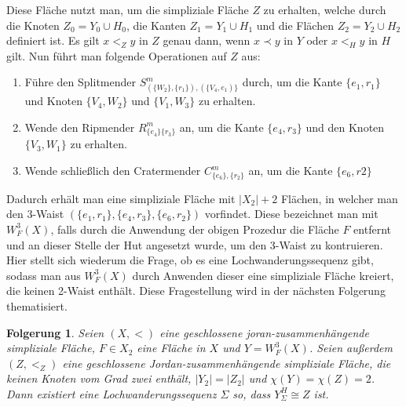 \documentclass[12pt,titlepage,twoside,cleardoublepage]{article}
\theoremstyle{nummermitklammern}
\newtheorem{folgerung}[temp]{Folgerung}
\newtheorem{folgerung}[zahl]{Folgerung}
\numberwithin{equation}{section}
\begin{document}
Diese Fläche nutzt man, um die simpliziale Fläche $Z$ zu erhalten, welche durch die Knoten $Z_0=Y_0 \cup H_0$, die Kanten $Z_1=Y_1 \cup H_1$ und die Flächen $Z_2=Y_2 \cup H_2$ definiert ist. Es gilt $x<_Z y$ in $Z$ genau dann, wenn $x \prec y$ in $Y$ oder $x <_H y$ in $H$ gilt. Nun führt man folgende Operationen auf $Z$ aus:
\begin{enumerate}
\item Führe den Splitmender $S^m_{(\{W_2\},\{r_1\}),(\{V_4,e_1)\}}$ durch, um die Kante $\{e_1,r_1\}$ und Knoten $\{V_4,W_2\}$ und $\{V_1,W_3\}$ zu erhalten.
\item Wende den Ripmender $R^m_{\{e_4\}\{r_3\}}$ an, um die Kante $\{e_4,r_3\}$ und den Knoten $\{V_3,W_1\}$ zu erhalten. 
\item Wende schließlich den Cratermender $C^m_{\{e_6\},\{r_2\}}$ an, um die Kante $\{e_6,r2\}$
\end{enumerate}
Dadurch erhält man eine simpliziale Fläche mit $\vert X_2\vert +2$ Flächen, in welcher man den 3-Waist $(\{e_1,r_1\},\{e_4,r_3\},\{e_6,r_2\})$ vorfindet. Diese bezeichnet man mit \emph{$W_F^3(X)$}, falls durch die Anwendung der obigen Prozedur die Fläche $F$ entfernt und an dieser Stelle der Hut angesetzt wurde, um den 3-Waist zu kontruieren.\\
Hier stellt sich wiederum die Frage, ob es eine Lochwanderungssequenz gibt, sodass man aus $W_F^3(X)$ durch Anwenden dieser eine simpliziale Fläche kreiert, die keinen 2-Waist enthält. Diese Fragestellung wird in der nächsten Folgerung thematisiert.
\begin{folgerung}
Seien $(X,<)$ eine geschlossene joran-zusammenhängende simpliziale Fläche, $F\in X_2$ eine Fläche in $X$ und $Y=W^3_F(X)$. Seien außerdem $(Z,<_Z)$ eine geschlossene Jordan-zusammenhängende simpliziale Fläche, die keinen Knoten vom Grad zwei enthält, $\vert Y_2 \vert = \vert Z_2 \vert$ und $\chi(Y)=\chi(Z)=2$. Dann existiert eine Lochwanderungssequenz $\Sigma$ so, dass $Y_{\Sigma}^H \cong Z$ ist.
\end{folgerung}
\end{document}
